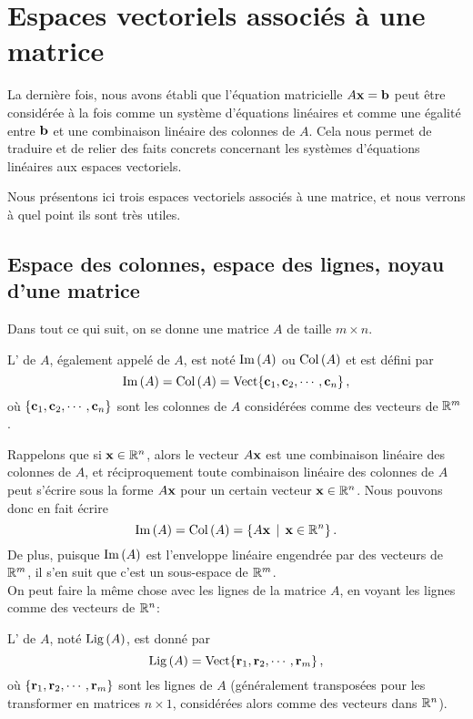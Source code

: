 \chapter{Espaces vectoriels associés à une matrice}
\label{chapter:Fr_17-homogsystems}


La dernière fois, nous avons établi que l'équation matricielle $A\mathbf{x} = \mathbf{b}$
peut être considérée à la fois comme un système d'équations linéaires et comme une égalité entre $\mathbf{b}$ et une combinaison linéaire des colonnes de $A$.  Cela nous permet
de traduire et de relier des faits concrets concernant les systèmes d'équations linéaires aux 
espaces vectoriels.

Nous présentons ici trois espaces vectoriels associés à une matrice, et nous verrons à quel point ils sont très utiles. 




\section{Espace des colonnes, espace des lignes, noyau d'une matrice}

Dans tout ce qui suit, on se donne une matrice $A$ de taille $m \times n$.

\begin{definition}
L' de $A$, également appelé  de $A$, est noté $\operatorname{Im}\,(A)$ ou $\operatorname{Col\,}(A)$ et est d\'efini par
$$
\operatorname{Im}\,(A)=\operatorname{Col\,}(A) = \textrm{Vect}\{ \mathbf{c}_1, \mathbf{c}_2, \cdots, \mathbf{c}_n\}\,,
$$
où $\{ \mathbf{c}_1, \mathbf{c}_2, \cdots, \mathbf{c}_n\}$ sont les colonnes
de $A$ consid\'er\'ees comme des vecteurs de $\mathbb{R}^m$.  
\end{definition}

Rappelons que si $\mathbf{x}\in \mathbb{R}^n$, alors le vecteur $A\mathbf{x}$ est une combinaison linéaire des colonnes de $A$, et réciproquement toute combinaison linéaire des colonnes de $A$ peut s'écrire sous la forme $A\mathbf{x}$ pour un certain vecteur $\mathbf{x}\in\mathbb{R}^n$. Nous pouvons donc en fait écrire
$$
\operatorname{Im}\,(A) =\operatorname{Col\,}(A)= \{A\mathbf{x}\, \mid \, \mathbf{x}\in \mathbb{R}^n\}\,.
$$
De plus, puisque $\operatorname{Im}\,(A)$ est l'enveloppe lin\'eaire engendr\'ee par des vecteurs de $\mathbb{R}^m$, il s'en suit que c'est un sous-espace de $\mathbb{R}^m$.\\

On peut faire la même chose avec les lignes de la matrice $A$, en voyant les lignes comme des vecteurs de $\mathbb{R}^n$:

\begin{definition}
L' de $A$, not\'e $\operatorname{Lig\,}(A)$, est donn\'e par
$$
\operatorname{Lig\,}(A) = \textrm{Vect}\{ \mathbf{r}_1, \mathbf{r}_2, \cdots, \mathbf{r}_m\}\,,
$$
où $\{ \mathbf{r}_1, \mathbf{r}_2, \cdots, \mathbf{r}_m\}$ sont les lignes de $A$
(généralement transposées pour les transformer en matrices $n\times 1$, 
considérées alors comme des vecteurs dans $\mathbb{R}^n$).  
\end{definition}

